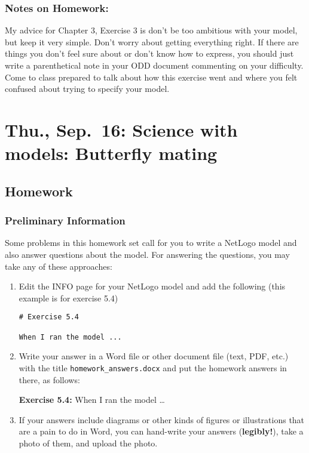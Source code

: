 \documentclass[
]{article}
\begin{document}
\hypertarget{notes-on-homework-1}{%
\subsubsection{Notes on Homework:}\label{notes-on-homework-1}}

My advice for Chapter 3, Exercise 3 is don't be too ambitious with your
model, but keep it very simple. Don't worry about getting everything
right. If there are things you don't feel sure about or don't know how
to express, you should just write a parenthetical note in your ODD
document commenting on your difficulty. Come to class prepared to talk
about how this exercise went and where you felt confused about trying to
specify your model.

\hypertarget{thu.-sep.-16-science-with-models-butterfly-mating}{%
\section{Thu., Sep.~16: Science with models: Butterfly
mating}\label{thu.-sep.-16-science-with-models-butterfly-mating}}

\hypertarget{homework-4}{%
\subsection{Homework}\label{homework-4}}

\hypertarget{preliminary-information-3}{%
\subsubsection{Preliminary
Information}\label{preliminary-information-3}}

Some problems in this homework set call for you to write a NetLogo model
and also answer questions about the model. For answering the questions,
you may take any of these approaches:

\begin{enumerate}
\def\labelenumi{\arabic{enumi}.}
\item
  Edit the INFO page for your NetLogo model and add the following (this
  example is for exercise 5.4)

\begin{verbatim}
# Exercise 5.4

When I ran the model ...
\end{verbatim}
\item
  Write your answer in a Word file or other document file (text, PDF,
  etc.) with the title \texttt{homework\_answers.docx} and put the
  homework answers in there, as follows:

  \textbf{Exercise 5.4:} When I ran the model \ldots{}
\item
  If your answers include diagrams or other kinds of figures or
  illustrations that are a pain to do in Word, you can hand-write your
  answers (\textbf{legibly!}), take a photo of them, and upload the
  photo.
\end{enumerate}
\end{document}
